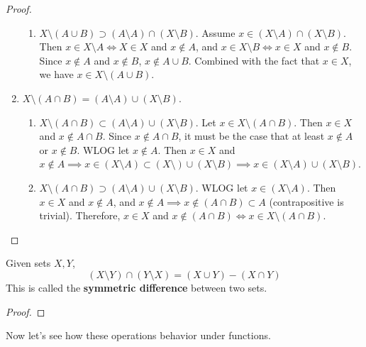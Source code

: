 \begin{proof}
\begin{enumerate}
\begin{enumerate}
          \item $X \setminus (A \cup B) \supset (A \setminus A) \cap (X \setminus B)$. Assume $x \in (X \setminus A) \cap (X \setminus B)$. Then $x \in X \setminus A \iff X \in X$ and $x \not\in A$, and $x \in X \setminus B \iff x \in X$ and $x \not\in B$. Since $x \not\in A$ and $x \not\in B$, $x \not\in A \cup B$. Combined with the fact that $x \in X$, we have $x \in X \setminus (A \cup B)$. 
        \end{enumerate}

      \item $X \setminus (A \cap B) = (A \setminus A) \cup (X \setminus B)$.
        \begin{enumerate}
          \item $X \setminus (A \cap B) \subset (A \setminus A) \cup (X \setminus B)$. Let $x \in X \setminus (A \cap B)$. Then $x \in X$ and $x \not\in A \cap B$. Since $x \not\in A \cap B$, it must be the case that at least $x \not\in A$ or $x \not\in B$. WLOG let $x \not\in A$. Then $x \in X$ and $x \not\in A \implies x \in (X \setminus A) \subset (X \setminus) \cup (X \setminus B) \implies x \in (X \setminus A) \cup (X \setminus B)$. 

          \item $X \setminus (A \cap B) \supset (A \setminus A) \cup (X \setminus B)$. WLOG let $x \in (X \setminus A)$. Then $x \in X$ and $x \not\in A$, and $x \not\in A \implies x \not\in (A \cap B) \subset A$ (contrapositive is trivial). Therefore, $x \in X$ and $x \not\in (A \cap B) \iff  x \in X \setminus (A \cap B)$. 
        \end{enumerate}
    \end{enumerate}
  \end{proof} 

  \begin{corollary}
    Given sets $X, Y$, 
    \begin{equation}
      (X \setminus Y) \cap (Y \setminus X) = (X \cup Y) - (X \cap Y)
    \end{equation}
    This is called the \textbf{symmetric difference} between two sets. 
  \end{corollary}
  \begin{proof}
    
  \end{proof} 

  Now let's see how these operations behavior under functions. 

